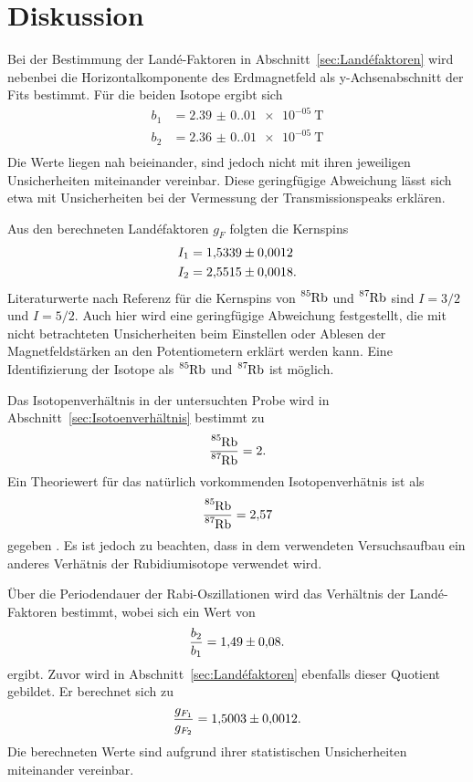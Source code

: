 \section{Diskussion}
\label{sec:Diskussion}
Bei der Bestimmung der Landé-Faktoren in Abschnitt~\ref{sec:Landéfaktoren} wird nebenbei die Horizontalkomponente des Erdmagnetfeld als y-Achsenabschnitt der
Fits bestimmt. Für die beiden Isotope ergibt sich
\begin{align*}
    b_1 &= \qty{2.39(0.01)e-05}{\tesla} \\
    b_2 &= \qty{2.36(0.01)e-05}{\tesla} \\
\end{align*}
Die Werte liegen nah beieinander, sind jedoch nicht mit ihren jeweiligen Unsicherheiten miteinander vereinbar. Diese geringfügige Abweichung lässt sich etwa mit
Unsicherheiten bei der Vermessung der Transmissionspeaks erklären.

Aus den berechneten Landéfaktoren $g_F$ folgten die Kernspins
\begin{align*}
    I_1 &= \num{1.5339+-0.0012} \\
    I_2 &= \num{2.5515+-0.0018}.
  \end{align*}
Literaturwerte nach Referenz \cite{Rubidium} für die Kernspins von $\ce{^{85}Rb}$ und $\ce{^{87}Rb}$ sind $I=3/2$ und $I=5/2$. Auch hier wird eine geringfügige
Abweichung festgestellt, die mit nicht betrachteten Unsicherheiten beim Einstellen oder Ablesen der Magnetfeldstärken an den Potentiometern erklärt werden kann.
Eine Identifizierung der Isotope als $\ce{^{85}Rb}$ und $\ce{^{87}Rb}$ ist möglich.

Das Isotopenverhältnis in der untersuchten Probe wird in Abschnitt~\ref{sec:Isotoenverhältnis} bestimmt zu
\begin{equation*}
    \frac{\ce{^{85}Rb}}{\ce{^{87}Rb}} = \num{2}.
  \end{equation*}
Ein Theoriewert für das natürlich vorkommenden Isotopenverhätnis ist als
\begin{equation*}
    \frac{\ce{^{85}Rb}}{\ce{^{87}Rb}} = \num{2.57}
  \end{equation*}
gegeben \cite{Rubidium}. Es ist jedoch zu beachten, dass in dem verwendeten Versuchsaufbau ein anderes Verhätnis der Rubidiumisotope verwendet wird.

Über die Periodendauer der Rabi-Oszillationen wird das Verhältnis der Landé-Faktoren bestimmt, wobei sich ein Wert von
\begin{equation*}
    \frac{b_2}{b_1} = \num{1.49+-0.08}.
  \end{equation*}
ergibt. Zuvor wird in Abschnitt~\ref{sec:Landéfaktoren} ebenfalls dieser Quotient gebildet. Er berechnet sich zu
\begin{equation*}
    \frac{g_{F_1}}{g_{F_2}} = \num{1.5003+-0.0012}.
\end{equation*}
Die berechneten Werte sind aufgrund ihrer statistischen Unsicherheiten miteinander vereinbar.